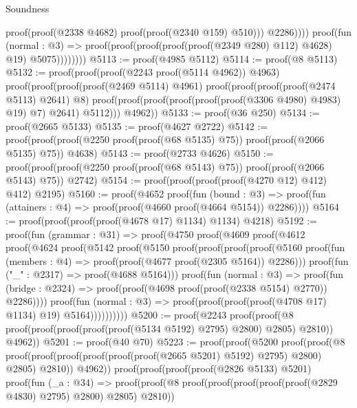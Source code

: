 \begin{lexlean}{Soundness}
\begin{coremodule}
                                      proof(proof(@2338 @4682) proof(proof(@2340 @159) @510)))
                                    @2286))))
                          proof(fun (normal : @3) =>
                            proof(proof(proof(proof(proof(@2349 @280) @112) @4628) @19)
                                @5075))))))))
@5113 := proof(@4985 @5112)
@5114 := proof(@8 @5113)
@5132 := proof(proof(proof(@2243 proof(@5114 @4962)) @4963)
      proof(proof(proof(proof(@2469 @5114) @4961)
            proof(proof(proof(proof(@2474 @5113) @2641) @8)
                proof(proof(proof(proof(proof(proof(@3306 @4980) @4983) @19) @7) @2641) @5112)))
          @4962))
@5133 := proof(@36 @250)
@5134 := proof(@2665 @5133)
@5135 := proof(@4627 @2722)
@5142 := proof(proof(proof(@2250 proof(proof(@68 @5135) @75)) proof(proof(@2066 @5135) @75)) @4638)
@5143 := proof(@2733 @4626)
@5150 := proof(proof(proof(@2250 proof(proof(@68 @5143) @75)) proof(proof(@2066 @5143) @75)) @2742)
@5154 := proof(proof(proof(proof(@4270 @12) @412) @412) @2195)
@5160 := proof(@4652
      proof(fun (bound : @3) =>
        proof(fun (attainers : @4) => proof(proof(@4660 proof(@4664 @5154)) @2286))))
@5164 := proof(proof(proof(proof(@4678 @17) @1134) @1134) @4218)
@5192 := proof(fun (grammar : @31) =>
    proof(@4750
        proof(@4609
            proof(@4612
                proof(@4624
                    proof(@5142
                        proof(@5150
                            proof(proof(proof(proof(@5160
                                      proof(fun (members : @4) =>
                                        proof(proof(@4677 proof(@2305 @5164)) @2286)))
                                    proof(fun ("_" : @2317) => proof(@4688 @5164)))
                                  proof(fun (normal : @3) =>
                                    proof(fun (bridge : @2324) =>
                                      proof(proof(@4698 proof(proof(@2338 @5154) @2770)) @2286))))
                                proof(fun (normal : @3) =>
                                  proof(proof(proof(proof(@4708 @17) @1134) @19) @5164))))))))))
@5200 := proof(@2243
      proof(proof(@8 proof(proof(proof(proof(proof(@5134 @5192) @2795) @2800) @2805) @2810)) @4962))
@5201 := proof(@40 @70)
@5223 := proof(proof(@5200
        proof(proof(@8
              proof(proof(proof(proof(proof(proof(@2665 @5201) @5192) @2795) @2800) @2805) @2810))
            @4962))
      proof(proof(proof(proof(@2826 @5133) @5201)
            proof(fun (_a : @34) =>
              proof(proof(@8 proof(proof(proof(proof(proof(@2829 @4830) @2795) @2800) @2805) @2810))

\end{coremodule}
\end{lexlean}
